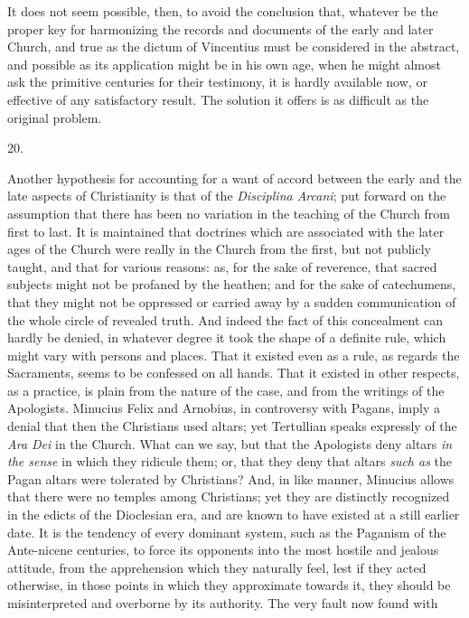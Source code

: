 It does not seem possible, then, to avoid the
conclusion that, whatever be the proper key for
harmonizing the records and documents of the early and
later Church, and true as the dictum of Vincentius must
be considered in the abstract, and possible as its
application might be in his own age, when he might almost
ask the primitive centuries for their testimony, it is
hardly available now, or effective of any satisfactory
result. The solution it offers is as difficult as the
original problem.

20.

Another hypothesis for accounting for a want of accord
between the early and the late aspects of Christianity is
that of the \emph{Disciplina Arcani}; put forward on the
assumption that there has been no variation in the
teaching of the Church from first to last. It is
maintained that doctrines which are associated with the
later ages of the Church were really in the Church from
the first, but not publicly taught, and that for various
reasons: as, for the sake of reverence, that sacred
subjects might not be profaned by the heathen; and for
the sake of catechumens, that they might not be oppressed
or carried away by a sudden communication of the whole
circle of revealed truth. And indeed the fact of this
concealment can hardly be denied, in whatever degree it
took the shape of a definite rule, which might vary with
persons and places. That it existed even as a rule, as
regards the Sacraments, seems to be confessed on all
hands. That it existed in other respects, as a practice,
is plain from the nature of the case, and from the
writings of the Apologists. Minucius Felix and Arnobius,
in controversy with Pagans, imply a denial that then the
Christians used altars; yet Tertullian speaks expressly
of the \emph{Ara Dei} in the Church. What can we say, but
that the Apologists deny altars \emph{in the sense} in
which they ridicule them; or, that they deny that altars \emph{such
as} the Pagan altars were tolerated by Christians?
And, in like manner, Minucius allows that there were no
temples among Christians; yet they are distinctly
recognized in the edicts of the Dioclesian era, and are
known to have existed at a still earlier date. It is the
tendency of every dominant system, such as the Paganism
of the Ante-nicene centuries, to force its opponents into
the most hostile and jealous attitude, from the
apprehension which they naturally feel, lest if they
acted otherwise, in those points in which they
approximate towards it, they should be misinterpreted and
overborne by its authority. The very fault now found with
